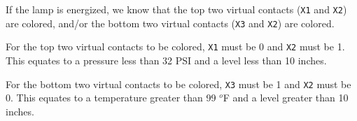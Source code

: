 
If the lamp is energized, we know that the top two virtual contacts ({\tt X1} and {\tt X2}) are colored, and/or the bottom two virtual contacts ({\tt X3} and {\tt X2}) are colored.

\vskip 10pt

For the top two virtual contacts to be colored, {\tt X1} must be 0 and {\tt X2} must be 1.  This equates to a pressure less than 32 PSI and a level less than 10 inches.

\vskip 10pt

For the bottom two virtual contacts to be colored, {\tt X3} must be 1 and {\tt X2} must be 0.  This equates to a temperature greater than 99 $^{o}$F and a level greater than 10 inches.











